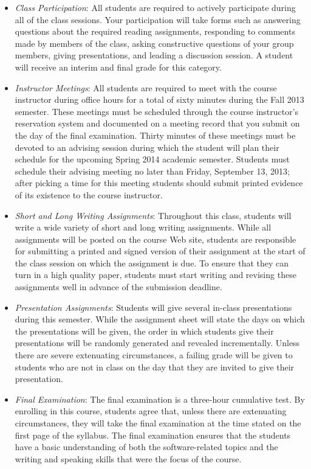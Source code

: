 \begin{itemize}

	\item {\em Class Participation}: All students are required to actively participate during
		all of the class sessions. Your participation will take forms such as answering questions about the required
		reading assignments, responding to comments made by members of the class, asking constructive questions of your 
		group members, giving presentations, and leading a discussion session. A student will receive an interim and
		final grade for this category.

	\item {\em Instructor Meetings}: All students are required to meet with the course instructor during office
		hours for a total of sixty minutes during the Fall 2013 semester.  These meetings must be scheduled through the
		course instructor's reservation system and documented on a meeting record that you submit on the day of the final
		examination.  Thirty minutes of these meetings must be devoted to an advising session during which the student
		will plan their schedule for the upcoming Spring 2014 academic semester.  Students must schedule their advising
		meeting no later than Friday, September 13, 2013; after picking a time for this meeting students should submit
		printed evidence of its existence to the course instructor.

	\item {\em Short and Long Writing Assignments}: Throughout this class, students will write a wide variety of short
		and long writing assignments.  While all assignments will be posted on the course Web site, students are
		responsible for submitting a printed and signed version of their assignment at the start of the class session on
		which the assignment is due.  To ensure that they can turn in a high quality paper, students must start writing
		and revising these assignments well in advance of the submission deadline.

	\item {\em Presentation Assignments}: Students will give several in-class presentations during this semester. While
		the assignment sheet will state the days on which the presentations will be given, the order in which students
		give their presentations will be randomly generated and revealed incrementally.  Unless there are severe
		extenuating circumstances, a failing grade will be given to students who are not in class on the day that they
		are invited to give their presentation.

	\item {\em Final Examination}: The final examination is a three-hour cumulative test.  By enrolling in this course,
		students agree that, unless there are extenuating circumstances, they will take the final examination at the
		time stated on the first page of the syllabus.  The final examination ensures that the students have a basic
		understanding of both the software-related topics and the writing and speaking skills that were the focus of the
		course.
	
\end{itemize}


